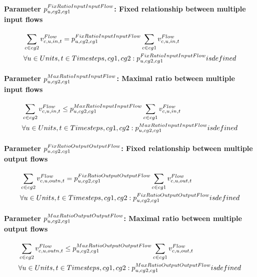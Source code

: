 \paragraph{Parameter $\pFixRatioInputInputFlow$: Fixed relationship between multiple input flows}
\begin{align} \label{eq:fixratioinputinputflow}
&\sum_{\commodity \in cg2} \vFlow[\commodity,\unit,in,\timestep] = \pFixRatioInputInputFlow \sum_{\commodity \in cg1} \vFlow[\commodity,\unit,in,\timestep] \nonumber \\
&\forall \units, \timesteps, cg1, cg2: \pFixRatioInputInputFlow is defined
\end{align}

\paragraph{Parameter $\pMaxRatioInputInputFlow$: Maximal ratio between multiple input flows}
\begin{align} \label{eq:maxratioinputinputflow}
&\sum_{\commodity \in cg2} \vFlow[\commodity,\unit,in,\timestep] \le \pMaxRatioInputInputFlow \sum_{\commodity \in cg1} \vFlow[\commodity,\unit,in,\timestep] \nonumber \\
&\forall \units, \timesteps, cg1, cg2: \pMaxRatioInputInputFlow is defined
\end{align}

\paragraph{Parameter $\pFixRatioOutputOutputFlow$: Fixed relationship between multiple output flows}
\begin{align} \label{eq:fixratiooutputoutputflow}
&\sum_{\commodity \in cg2} \vFlow[\commodity,\unit,outn,\timestep] = \pFixRatioOutputOutputFlow \sum_{\commodity \in cg1} \vFlow[\commodity,\unit,out,\timestep] \nonumber \\
&\forall \units, \timesteps, cg1, cg2: \pFixRatioOutputOutputFlow is defined
\end{align}

\paragraph{Parameter $\pMaxRatioOutputOutputFlow$: Maximal ratio between multiple output flows}
\begin{align} \label{eq:maxratiooutputoutputflow}
&\sum_{\commodity \in cg2} \vFlow[\commodity,\unit,outn,\timestep] \le \pMaxRatioOutputOutputFlow \sum_{\commodity \in cg1} \vFlow[\commodity,\unit,out,\timestep] \nonumber \\
&\forall \units, \timesteps, cg1, cg2: \pMaxRatioOutputOutputFlow is defined
\end{align}




